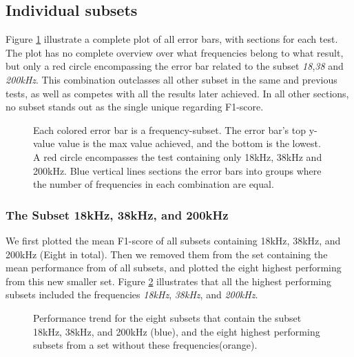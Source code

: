     \subsection{Individual subsets}
        Figure \ref{errorbar_fig} illustrate a complete plot of all error bars, with sections for each test. The plot has no complete overview over what frequencies belong to what result, but only a red circle encompassing the error bar related to the subset \textit{18},\textit{38} and \textit{200kHz}. This combination outclasses all other subset in the same and previous tests, as well as competes with all the results later achieved. In all other sections, no subset stands out as the single unique regarding F1-score.
        \begin{figure}[H]
            \centering
            
            \caption[Error bars per combination]{Each colored error bar is a frequency-subset. The error bar's top y-value value is the max value achieved, and the bottom is the lowest. A red circle encompasses the test containing only 18kHz, 38kHz and 200kHz. Blue vertical lines sections the error bars into groups where the number of frequencies in each combination are equal.}
          	\medskip 
            \label{errorbar_fig}
        \end{figure}
    
    \subsubsection{The Subset 18kHz, 38kHz, and 200kHz}
         We first plotted the mean F1-score of all subsets containing 18kHz, 38kHz, and 200kHz (Eight in total). Then we removed them from the set containing the mean performance from of all subsets, and plotted the eight highest performing from this new smaller set. Figure \ref{with_without_figure} illustrates that all the highest performing subsets included the frequencies \textit{18kHz}, \textit{38kHz}, and \textit{200kHz}.
        
        \begin{figure}[H]
            \centering
            
            \caption[With and without unique subset]{Performance trend for the eight subsets that contain the subset 18kHz, 38kHz, and 200kHz (blue), and the eight highest performing subsets from a set without these frequencies(orange).}
          	\medskip 
            \label{with_without_figure}
        \end{figure}
        
